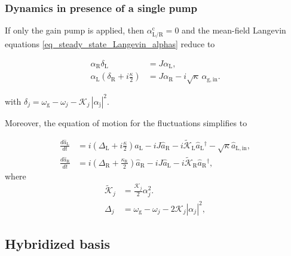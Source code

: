 \documentclass[%
reprint,
floatfix,
superscriptaddress,
amsmath,amssymb,
aps,
pra,
]{revtex4-2}
\newcommand*{\scrpt}[1]{\mathrm{#1}}
\newcommand*{\s}[1]{\ensuremath{_\scrpt{#1}}}
\begin{document}
\subsubsection{Dynamics in presence of a single pump}
\label{A_Theory_Single_Pump_bare}

If only the gain pump is applied, then $\alpha\mathrm{^{c}_{L/R}}=0$ and the mean-field Langevin equations \cref{eq_steady_state_Langevin_alphas} reduce to 

\begin{subequations}
\label{MF_Bare_single}
\begin{align}
\alpha_\mathrm{R}  \delta\s{L} & = J \alpha\s{L}, \\
 \alpha\s{L} \left( \delta\s{R}  + i \frac{\kappa}{2} \right) & = J \alpha\mathrm{_R} - i \sqrt{\kappa} \, \alpha\s{g,in}.
\end{align}
\label{eq_langevin_bare_basis}
\end{subequations}

%
with $\delta_j=\omega\s{g}-\omega_j-\mathcal{K}_j\, |\alpha\mathrm{_{j}}|^2$.

Moreover, the equation of motion for the fluctuations simplifies to 

\begin{subequations}
\label{LELB}
    \begin{align}
     \frac{d \hat a\s{L}}{d t} & =  i \left( \Delta\s{L}  + i \frac{\kappa}{2} \right) \hat{a}\s{L} - i J \hat a\s{R} - i \tilde{\mathcal{K}}\s{L} \hat a\s{L}^{\dagger} - \sqrt{\kappa} \hat a\s{L,in}, \\
     \frac{d \hat a\s{R}}{d t} & = i \left( \Delta\s{R} + \frac{\kappa\s{R}}{2} \right) \hat{a}\s{R} - i J \hat a\s{L} - i \tilde{\mathcal{K}}\s{R} \hat a\s{R}^{\dagger},
\end{align}
\end{subequations}
%
where
%
\begin{subequations}
\begin{align}
\label{delta_single}
\tilde{\mathcal{K}}_j & = \frac{\mathcal{K}_j}{2} \alpha_j^2.  \\
\Delta_{j} & = \omega\s{g} -\omega_j -  2 \mathcal{K}_j |\alpha_{j}|^2,  
\end{align}
\end{subequations}
%
\subsection{Hybridized basis}
\label{A_Double_pump_hybrid_basis}
\end{document}
